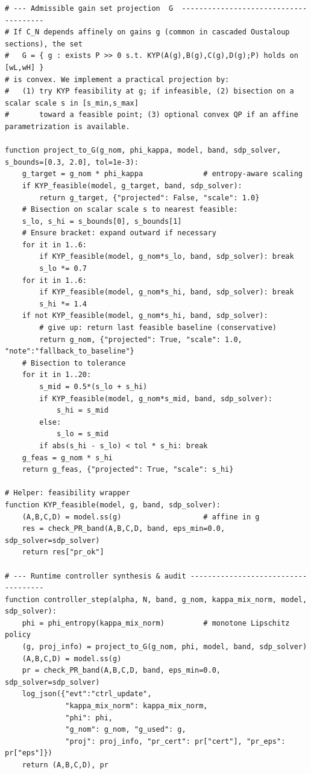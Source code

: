 \begin{lstlisting}
# --- Admissible gain set projection  G  --------------------------------------
# If C_N depends affinely on gains g (common in cascaded Oustaloup sections), the set
#   G = { g : exists P >> 0 s.t. KYP(A(g),B(g),C(g),D(g);P) holds on [wL,wH] }
# is convex. We implement a practical projection by:
#   (1) try KYP feasibility at g; if infeasible, (2) bisection on a scalar scale s in [s_min,s_max]
#       toward a feasible point; (3) optional convex QP if an affine parametrization is available.

function project_to_G(g_nom, phi_kappa, model, band, sdp_solver, s_bounds=[0.3, 2.0], tol=1e-3):
    g_target = g_nom * phi_kappa              # entropy-aware scaling
    if KYP_feasible(model, g_target, band, sdp_solver):
        return g_target, {"projected": False, "scale": 1.0}
    # Bisection on scalar scale s to nearest feasible:
    s_lo, s_hi = s_bounds[0], s_bounds[1]
    # Ensure bracket: expand outward if necessary
    for it in 1..6:
        if KYP_feasible(model, g_nom*s_lo, band, sdp_solver): break
        s_lo *= 0.7
    for it in 1..6:
        if KYP_feasible(model, g_nom*s_hi, band, sdp_solver): break
        s_hi *= 1.4
    if not KYP_feasible(model, g_nom*s_hi, band, sdp_solver):
        # give up: return last feasible baseline (conservative)
        return g_nom, {"projected": True, "scale": 1.0, "note":"fallback_to_baseline"}
    # Bisection to tolerance
    for it in 1..20:
        s_mid = 0.5*(s_lo + s_hi)
        if KYP_feasible(model, g_nom*s_mid, band, sdp_solver):
            s_hi = s_mid
        else:
            s_lo = s_mid
        if abs(s_hi - s_lo) < tol * s_hi: break
    g_feas = g_nom * s_hi
    return g_feas, {"projected": True, "scale": s_hi}

# Helper: feasibility wrapper
function KYP_feasible(model, g, band, sdp_solver):
    (A,B,C,D) = model.ss(g)                   # affine in g
    res = check_PR_band(A,B,C,D, band, eps_min=0.0, sdp_solver=sdp_solver)
    return res["pr_ok"]

# --- Runtime controller synthesis & audit ------------------------------------
function controller_step(alpha, N, band, g_nom, kappa_mix_norm, model, sdp_solver):
    phi = phi_entropy(kappa_mix_norm)         # monotone Lipschitz policy
    (g, proj_info) = project_to_G(g_nom, phi, model, band, sdp_solver)
    (A,B,C,D) = model.ss(g)
    pr = check_PR_band(A,B,C,D, band, eps_min=0.0, sdp_solver=sdp_solver)
    log_json({"evt":"ctrl_update",
              "kappa_mix_norm": kappa_mix_norm,
              "phi": phi,
              "g_nom": g_nom, "g_used": g,
              "proj": proj_info, "pr_cert": pr["cert"], "pr_eps": pr["eps"]})
    return (A,B,C,D), pr


\end{lstlisting}
